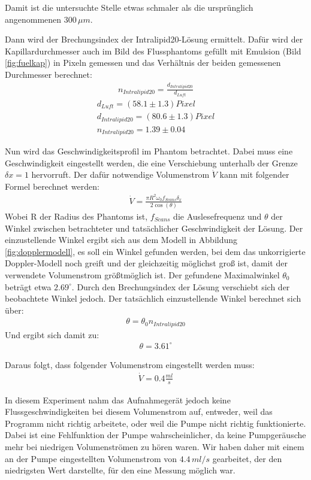 \documentclass[german, %
parskip=full, %
bibliography=totoc, %
]{scrartcl}
\begin{document}
Damit ist die untersuchte Stelle etwas schmaler als die ursprünglich angenommenen $300\, \mu m$.

Dann wird der Brechungsindex der Intralipid20-Lösung ermittelt. Dafür wird der Kapillardurchmesser auch im Bild des Flussphantoms gefüllt mit Emulsion (Bild \ref{fig:fuelkap}) in Pixeln gemessen und das Verhältnis der beiden gemessenen Durchmesser berechnet: 
\begin{align}
n_{Intralipid20} = \frac{d_{Intralipid20}}{d_{Luft}}
\end{align}
\begin{align*}
d_{Luft} = (58.1 \pm 1.3) Pixel \\
d_{Intralipid20} = (80.6 \pm 1.3) Pixel \\
n_{Intralipid20} = 1.39 \pm 0.04
\end{align*}

Nun wird das Geschwindigkeitsprofil im Phantom betrachtet. Dabei muss eine Geschwindigkeit eingestellt werden, die eine Verschiebung unterhalb der Grenze $\delta x = 1$ hervorruft. Der dafür notwendige Volumenstrom $\dot V$ kann mit folgender Formel berechnet werden: 
\begin{align}
\dot V = \frac{\pi R^2 \omega_0 f_{Scans} \delta_x}{2 \cos (\theta)}
\end{align}
Wobei R der Radius des Phantoms ist, $f_{Scans}$ die Auslesefrequenz und $\theta$ der Winkel zwischen betrachteter und tatsächlicher Geschwindigkeit der Lösung. Der einzustellende Winkel ergibt sich aus dem Modell in Abbildung \ref{fig:dopplermodell}, es soll ein Winkel gefunden werden, bei dem das unkorrigierte Doppler-Modell noch greift und der gleichzeitig möglichst groß ist, damit der verwendete Volumenstrom größtmöglich ist. Der gefundene Maximalwinkel $\theta_0$ beträgt etwa $2.69^\circ$. Durch den Brechungsindex der Lösung verschiebt sich der beobachtete Winkel jedoch. Der tatsächlich einzustellende Winkel berechnet sich über:
\begin{align}
\theta = \theta_0 n_{Intralipid20}
\end{align}
Und ergibt sich damit zu:
\begin{align*}
\theta = 3.61^\circ
\end{align*}

Daraus folgt, dass folgender Volumenstrom eingestellt werden muss:
\begin{align*}
\dot V = 0.4 \frac{ml}{s}
\end{align*}

In diesem Experiment nahm das Aufnahmegerät jedoch keine Flussgeschwindigkeiten bei diesem Volumenstrom auf, entweder, weil das Programm nicht richtig arbeitete, oder weil die Pumpe nicht richtig funktionierte. Dabei ist eine Fehlfunktion der Pumpe wahrscheinlicher, da keine Pumpgeräusche mehr bei niedrigen Volumenströmen zu hören waren. Wir haben daher mit einem an der Pumpe eingestellten Volumenstrom von $4.4\, ml/s$ gearbeitet, der den niedrigsten Wert darstellte, für den eine Messung möglich war.
\end{document}
